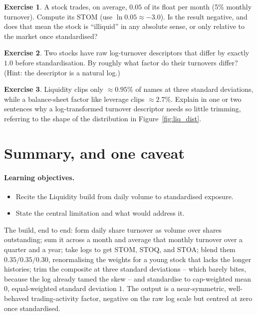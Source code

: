 \documentclass[11pt]{article}
\theoremstyle{definition}
\newtheorem{exercise}{Exercise}[section]
\theoremstyle{plain}
\theoremstyle{remark}
\begin{document}
\begin{exercise}
A stock trades, on average, $0.05$ of its float per month (5\% monthly turnover). Compute its STOM (use $\ln 0.05 \approx -3.0$). Is the result negative, and does that mean the stock is ``illiquid'' in any absolute sense, or only relative to the market once standardised?
\end{exercise}

\begin{exercise}
Two stocks have raw log-turnover descriptors that differ by exactly $1.0$ before standardisation. By roughly what factor do their turnovers differ? (Hint: the descriptor is a natural log.)
\end{exercise}

\begin{exercise}
Liquidity clips only $\approx 0.95\%$ of names at three standard deviations, while a balance-sheet factor like leverage clips $\approx 2.7\%$. Explain in one or two sentences why a log-transformed turnover descriptor needs so little trimming, referring to the shape of the distribution in Figure~\ref{fig:liq_dist}.
\end{exercise}

\section{Summary, and one caveat}\label{sec:summary}

\paragraph{Learning objectives.}
\begin{itemize}[leftmargin=1.4em,topsep=2pt]
  \item Recite the Liquidity build from daily volume to standardised exposure.
  \item State the central limitation and what would address it.
\end{itemize}

The build, end to end: form daily share turnover as volume over shares outstanding; sum it across a month and average that monthly turnover over a quarter and a year; take logs to get STOM, STOQ, and STOA; blend them $0.35/0.35/0.30$, renormalising the weights for a young stock that lacks the longer histories; trim the composite at three standard deviations -- which barely bites, because the log already tamed the skew -- and standardise to cap-weighted mean $0$, equal-weighted standard deviation $1$. The output is a near-symmetric, well-behaved trading-activity factor, negative on the raw log scale but centred at zero once standardised.
\end{document}
